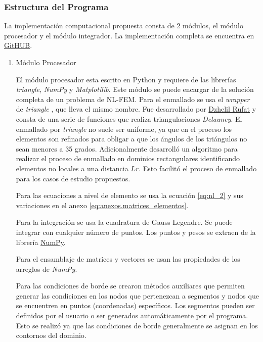 		\subsubsection{Estructura del Programa}
		La implementación computacional propuesta consta de 2 módulos, el módulo procesador y el módulo integrador. La implementación completa se encuentra en \href{https://github.com/ZibraMax/NLFEM}{GitHUB}. 
			\begin{enumerate}
				\item Módulo Procesador

				El módulo procesador esta escrito en Python y requiere de las librerías \textit{triangle}, \textit{NumPy} y \textit{Matplotilib}. Este módulo se puede encargar de la solución completa de un problema de NL-FEM.
				Para el enmallado se usa el \textit{wrapper} de \textit{triangle} \parencite{triangle}, que lleva el mismo nombre. Fue desarrollado por \href{https://rufat.be/index.html}{Dzhelil Rufat} y consta de una serie de funciones que realiza triangulaciones \textit{Delauney}. El enmallado por \textit{triangle} no suele ser uniforme, ya que en el proceso los elementos son refinados para obligar a que los ángulos de los triángulos no sean menores a 35 grados.
				Adicionalmente \cite{ProgramaEnmallado} desarrolló un algoritmo para realizar el proceso de enmallado en dominios rectangulares identificando elementos no locales a una distancia $Lr$. Esto facilitó el proceso de enmallado para los casos de estudio propuestos.

				Para las ecuaciones a nivel de elemento se usa la ecuación \ref{eq:nl_2} y sus variaciones en el anexo \ref{eq:anexos.matrices_elementos}.

				Para la integración se usa la cuadratura de Gauss Legendre. Se puede integrar con cualquier número de puntos. Los puntos y pesos se extraen de la librería \href{https://numpy.org/doc/stable/reference/generated/numpy.polynomial.legendre.leggauss.html}{NumPy}.

				Para el ensamblaje de matrices y vectores se usan las propiedades de los arreglos de \textit{NumPy}.

				Para las condiciones de borde se crearon métodos auxiliares que permiten generar las condiciones en los nodos que pertenezcan a segmentos y nodos que se encuentren en puntos (coordenadas) específicos. Los segmentos pueden ser definidos por el usuario o ser generados automáticamente por el programa. Esto se realizó ya que las condiciones de borde generalmente se asignan en los contornos del dominio.
				

\end{enumerate}
